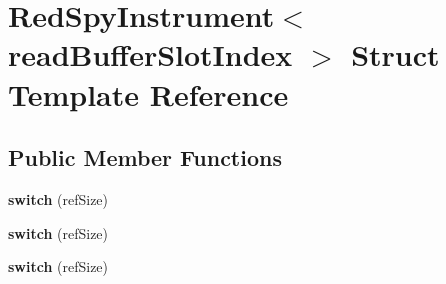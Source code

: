 \hypertarget{structRedSpyInstrument}{\section{Red\-Spy\-Instrument$<$ read\-Buffer\-Slot\-Index $>$ Struct Template Reference}
\label{structRedSpyInstrument}
}
\subsection*{Public Member Functions}
\begin{DoxyCompactItemize}
\item 
\hypertarget{structRedSpyInstrument_a5a36129af4cde74b50c606ee56bdb5bb}{{\bfseries switch} (ref\-Size)}\label{structRedSpyInstrument_a5a36129af4cde74b50c606ee56bdb5bb}

\item 
\hypertarget{structRedSpyInstrument_a5a36129af4cde74b50c606ee56bdb5bb}{{\bfseries switch} (ref\-Size)}\label{structRedSpyInstrument_a5a36129af4cde74b50c606ee56bdb5bb}

\item 
\hypertarget{structRedSpyInstrument_a5a36129af4cde74b50c606ee56bdb5bb}{{\bfseries switch} (ref\-Size)}\label{structRedSpyInstrument_a5a36129af4cde74b50c606ee56bdb5bb}

\end{DoxyCompactItemize}
